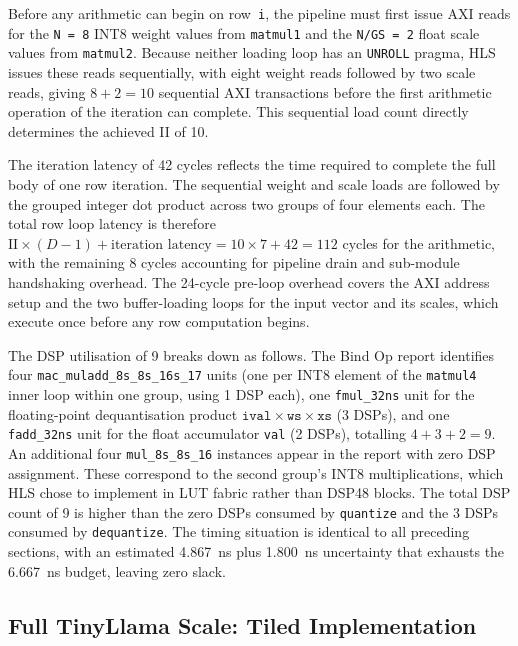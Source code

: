 Before any
arithmetic can begin on row~\texttt{i}, the pipeline must first issue AXI
reads for the \texttt{N = 8} INT8 weight values from \texttt{matmul1} and
the \texttt{N/GS = 2} float scale values from \texttt{matmul2}. Because
neither loading loop has an \texttt{UNROLL} pragma, HLS issues these
reads sequentially, with eight weight reads followed by two scale reads, giving
$8 + 2 = 10$ sequential AXI transactions before the first arithmetic
operation of the iteration can complete. This sequential load count
directly determines the achieved II of 10.

The iteration latency of 42 cycles reflects the time required to complete
the full body of one row iteration. The sequential weight and scale loads
are followed by the grouped integer dot product across two groups of four
elements each.
The total row loop latency is therefore $\text{II} \times (D - 1) +
\text{iteration latency} = 10 \times 7 + 42 = 112$ cycles for the
arithmetic, with the remaining 8 cycles accounting for pipeline drain and
sub-module handshaking overhead. The 24-cycle pre-loop overhead covers the
AXI address setup and the two buffer-loading loops for the input vector
and its scales, which execute once before any row computation begins.

The DSP utilisation of 9 breaks down as follows. The Bind Op report
identifies four \texttt{mac\_muladd\_8s\_8s\_16s\_17} units (one per INT8
element of the \texttt{matmul4} inner loop within one group, using 1
DSP each), one \texttt{fmul\_32ns} unit for the floating-point
dequantisation product $\texttt{ival} \times \texttt{ws} \times
\texttt{xs}$ (3 DSPs), and one \texttt{fadd\_32ns} unit for the
float accumulator \texttt{val} (2 DSPs), totalling $4 + 3 + 2 = 9$. An
additional four \texttt{mul\_8s\_8s\_16} instances appear in the report
with zero DSP assignment. These correspond to the second group's INT8
multiplications, which HLS chose to implement in LUT fabric rather than
DSP48 blocks. The total DSP count of 9
is higher than the zero DSPs consumed by \texttt{quantize} and the
3 DSPs consumed by \texttt{dequantize}. The timing situation is
identical to all preceding sections, with an estimated \SI{4.867}{\nano\second}
plus \SI{1.800}{\nano\second} uncertainty that exhausts the
\SI{6.667}{\nano\second} budget, leaving zero slack.


\subsection{Full TinyLlama Scale: Tiled Implementation}
\label{subsec:matmul_update3}

